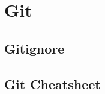 \section{Git}
\begin{minipage}[t]{0.49\textwidth}
\subsection{Gitignore}



\end{minipage}\hfill
\begin{minipage}[t]{0.49\textwidth}
\subsection{Git Cheatsheet}

\end{minipage}